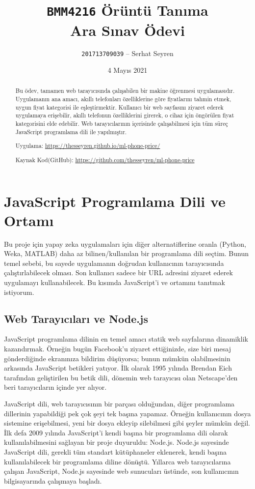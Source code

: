 \documentclass[a4paper,12pt]{article}
\title{\texttt{BMM4216} Örüntü Tanıma \\ Ara Sınav Ödevi}
\author{\texttt{201713709039} -- Serhat Seyren}
\date{4 Mayıs 2021}
\begin{document}
\maketitle

\begin{abstract}
Bu ödev, tamamen web tarayıcısında çalışabilen bir makine öğrenmesi uygulamasıdır.
Uygulamanın ana amacı, akıllı telefonları özelliklerine göre fiyatlarını tahmin etmek, uygun fiyat kategorisi ile eşleştirmektir.
Kullanıcı bir web sayfasını ziyaret ederek uygulamaya erişebilir, akıllı telefonun özelliklerini girerek, o cihaz için öngörülen fiyat kategorisini elde edebilir.
Web tarayıcılarının içerisinde çalışabilmesi için tüm süreç JavaScript programlama dili ile yapılmıştır.

Uygulama: \url{https://thesseyren.github.io/ml-phone-price/}

Kaynak Kod(GitHub): \url{https://github.com/thesseyren/ml-phone-price}
\end{abstract}

\tableofcontents

\newpage


\section{JavaScript Programlama Dili ve Ortamı}

Bu proje için yapay zeka uygulamaları için diğer alternatiflerine oranla (Python, Weka, MATLAB) daha az bilinen/kullanılan bir programlama dili seçtim.
Bunun temel sebebi, bu sayede uygulamanın doğrudan kullanıcının tarayıcısında çalıştırlabilecek olması.
Son kullanıcı sadece bir URL adresini ziyaret ederek uygulamayı kullanabilecek. Bu kısımda JavaScript'i ve ortamını tanıtmak istiyorum.

\subsection{Web Tarayıcıları ve Node.js}
JavaScript programlama dilinin en temel amacı statik web sayfalarına dinamiklik kazandırmak.
Örneğin bugün Facebook'u ziyaret ettiğinizde, size biri mesaj gönderdiğinde ekranınıza bildirim düşüyorsa; bunun mümkün olabilmesinin arkasında JavaScript betikleri yatıyor.
İlk olarak 1995 yılında Brendan Eich tarafından geliştirilen bu betik dili, dönemin web tarayıcısı olan Netscape'den beri tarayıcıların içinde yer alıyor.

JavaScript dili, web tarayıcısının bir parçası olduğundan, diğer programlama dillerinin yapabildiği pek çok şeyi tek başına yapamaz.
Örneğin kullanıcının dosya sistemine erişebilmesi, yeni bir dosya ekleyip silebilmesi gibi şeyler mümkün değil.
İlk defa 2009 yılında JavaScript'i kendi başına bir programlama dili olarak kullanılabilmesini sağlayan bir proje duyuruldu: Node.js.
Node.js sayesinde JavaScript dili, gerekli tüm standart kütüphaneler eklenerek, kendi başına kullanılabilecek bir programlama diline dönüştü.
Yıllarca web tarayıcılarına çalışan JavaScript, Node.js sayesinde web sunucuları üstünde, son kullanıcının bilgisayarında çalışmaya başladı.
\end{document}
